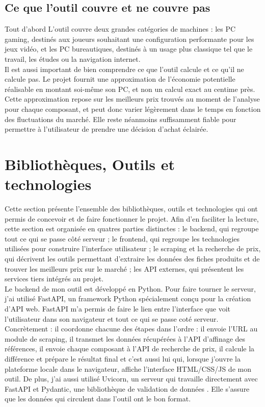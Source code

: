 \documentclass[a4paper, 12pt, twoside]{article}
\begin{document}
\subsection{Ce que l'outil couvre et ne couvre pas}

Tout d’abord L'outil couvre deux grandes catégories de machines : les PC gaming, destinés aux joueurs souhaitant une configuration performante pour les jeux vidéo, et les PC bureautiques, destinés à un usage plus classique tel que le travail, les études ou la navigation internet.\\
Il est aussi important de bien comprendre ce que l'outil calcule et ce qu'il ne calcule pas. Le projet fournit une approximation de l'économie potentielle réalisable en montant soi-même son PC, et non un calcul exact au centime près. Cette approximation repose sur les meilleurs prix trouvés au moment de l'analyse pour chaque composant, et peut donc varier légèrement dans le temps en fonction des fluctuations du marché. Elle reste néanmoins suffisamment fiable pour permettre à l'utilisateur de prendre une décision d'achat éclairée.

\newpage


\section{Bibliothèques, Outils et technologies}

Cette section présente l'ensemble des bibliothèques, outils et technologies qui ont permis de concevoir et de faire fonctionner le projet. Afin d'en faciliter la lecture, cette section est organisée en quatres parties distinctes : le backend, qui regroupe tout ce qui se passe côté serveur ; le frontend,  qui regroupe les technologies utilisées pour construire l'interface utilisateur ; le scraping et la recherche de prix, qui décrivent les outils permettant d'extraire les données des fiches produits et de trouver les meilleurs prix sur le marché ; les API externes, qui présentent les services tiers intégrés au projet.\\

Le backend de mon outil est développé en Python. Pour faire tourner le serveur, j’ai utilisé FastAPI, un framework Python spécialement conçu pour la création d'API web. FastAPI m'a permis de faire le lien entre l'interface que voit l'utilisateur dans son navigateur et tout ce qui se passe coté serveur. Concrètement : il coordonne chacune des étapes dans l'ordre : il envoie l'URL au module de scraping, il transmet les données récupérées à l'API d'affinage des références, il envoie chaque composant à l'API de recherche de prix, il calcule la différence et prépare le résultat final et c’est aussi lui qui, lorsque j'ouvre la plateforme locale dans le navigateur, affiche l'interface HTML/CSS/JS de mon outil. De plus, j’ai aussi utilisé Uvicorn, un serveur qui travaille directement avec FastAPI et Pydantic, une bibliothèque de validation de données
. Elle s'assure que les données qui circulent dans l’outil ont le bon format.\\
\end{document}

